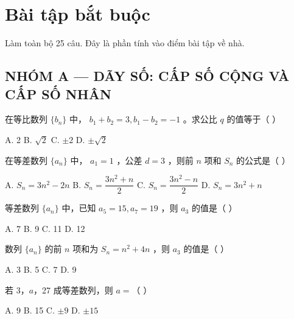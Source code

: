 \documentclass[11pt, a4paper]{article}
\begin{document}

\section{Bài tập bắt buộc}

Làm toàn bộ 25 câu. Đây là phần tính vào điểm bài tập về nhà.

\subsection*{NHÓM A — DÃY SỐ: CẤP SỐ CỘNG VÀ CẤP SỐ NHÂN}

\begin{baitap}[1]
在等比数列 $\{b_n\}$ 中， $b_1 + b_2 = 3, b_1 - b_2 = -1$ 。求公比 $q$ 的值等于（ ）
\par\vspace{3pt}
\noindent A. 2 \quad B. $\sqrt{2}$ \quad C. $\pm 2$ \quad D. $\pm\sqrt{2}$
\end{baitap}

\begin{baitap}[2]
在等差数列 $\{a_n\}$ 中， $a_1 = 1$ ，公差 $d = 3$ ，则前 $n$ 项和 $S_n$ 的公式是（ ）
\par\vspace{3pt}
\noindent A. $S_n = 3n^2 - 2n$ \quad B. $S_n = \dfrac{3n^2 + n}{2}$ \quad C. $S_n = \dfrac{3n^2 - n}{2}$ \quad D. $S_n = 3n^2 + n$
\end{baitap}

\begin{baitap}[3]
等差数列 $\{a_n\}$ 中，已知 $a_5 = 15, a_7 = 19$ ，则 $a_3$ 的值是（ ）
\par\vspace{3pt}
\noindent A. 7 \quad B. 9 \quad C. 11 \quad D. 12
\end{baitap}

\begin{baitap}[4]
数列 $\{a_n\}$ 的前 $n$ 项和为 $S_n = n^2 + 4n$ ，则 $a_3$ 的值是（ ）
\par\vspace{3pt}
\noindent A. 3 \quad B. 5 \quad C. 7 \quad D. 9
\end{baitap}

\begin{baitap}[5]
若 3，$a$，27 成等差数列，则 $a =$（ ）
\par\vspace{3pt}
\noindent A. 9 \quad B. 15 \quad C. $\pm 9$ \quad D. $\pm 15$
\end{baitap}
\end{document}
